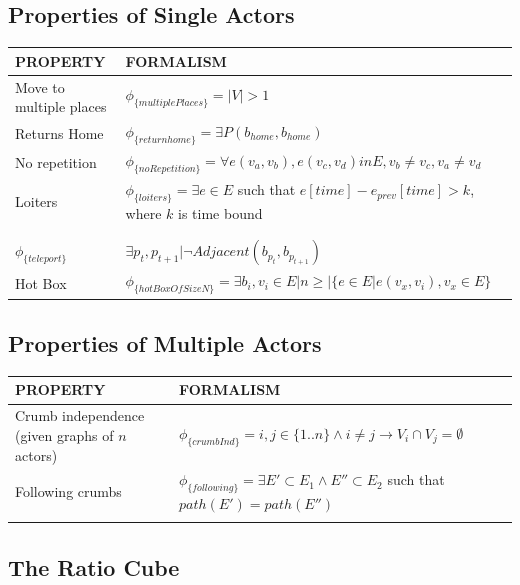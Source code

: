 \subsection{Properties of Single Actors}


\begin{tabular}{| p{2.8cm} | p{11.5cm} | }
\hline
PROPERTY & FORMALISM \\ \hline
Move to multiple places & $\phi_{\{multiplePlaces\}} = |V| > 1$ \\ \hline
Returns Home & $\phi_{\{returnhome\}} = \exists P(b_{home}, b_{home})$ \\ \hline
No repetition & $\phi_{\{noRepetition\}} = \forall e(v_a, v_b), e(v_c,v_d) in E, v_b \neq v_c, v_a \neq v_d$ \\ \hline
 Loiters & $\phi_{\{loiters\}} =  \exists e \in E$ such that $e[time] - e_{prev}[time] > k$, where $k$ is time bound \\ \hline
 & \\ \hline
 & \\ \hline
$\phi_{\{teleport\}}$ & $  \exists  p_t, p_{t+1} | \lnot Adjacent(b_{p_t}, b_{p_{t+1}})$ \\ \hline
Hot Box & $\phi_{\{hotBoxOfSizeN\}} = \exists b_i, v_i \in E | n \geq |\{e \in E | e(v_x, v_i), v_x \in E\}$ \\ \hline
\end{tabular}


\subsection{Properties of Multiple Actors}
\begin{tabular}{| p{2.8cm} | p{11.5cm} | }
\hline
PROPERTY & FORMALISM \\ \hline
 Crumb independence (given graphs of $n$ actors)& $\phi_{\{crumbInd\}} =  i,j \in \{1..n\} \land i \neq j \rightarrow V_i \cap V_j = \emptyset $ \\ \hline
 Following crumbs & $\phi_{\{following\}} =  \exists E' \subset E_1 \land E'' \subset E_2$ such that $path(E')=path(E'') $  \\ \hline
 & \\ \hline
\end{tabular}

\subsection{The Ratio Cube}

